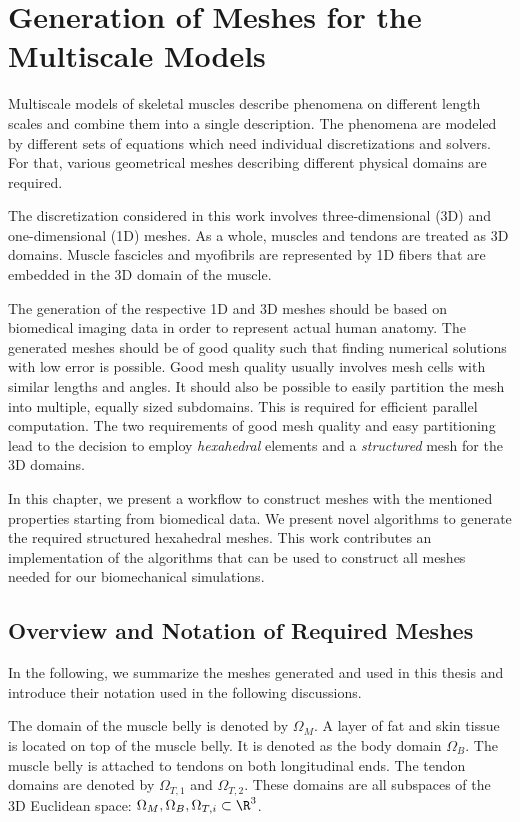
\chapter{Generation of Meshes for the Multiscale Models}\label{sec:generation_of_meshes_for_multiscale}
Multiscale models of skeletal muscles describe phenomena on different length scales and combine them into a single description. The phenomena are modeled by different sets of equations which need individual discretizations and solvers. For that, various geometrical meshes describing different physical domains are required.

The discretization considered in this work involves three-dimensional (3D) and one-dimensional (1D) meshes.
As a whole, muscles and tendons are treated as 3D domains. Muscle fascicles and myofibrils are represented by 1D fibers that are embedded in the 3D domain of the muscle.

The generation of the respective 1D and 3D meshes should be based on biomedical imaging data in order to represent actual human anatomy. The generated meshes should be of good quality such that finding numerical solutions with low error is possible. Good mesh quality usually involves mesh cells with similar lengths and angles. It should also be possible to easily partition the mesh into multiple, equally sized subdomains. This is required for efficient parallel computation.
The two requirements of good mesh quality and easy partitioning lead to the decision to employ \emph{hexahedral} elements and a \emph{structured} mesh for the 3D domains.

In this chapter, we present a workflow to construct meshes with the mentioned properties starting from biomedical data. We present novel algorithms to generate the required structured hexahedral meshes. This work contributes an implementation of the algorithms that can be used to construct all meshes needed for our biomechanical simulations.

\section{Overview and Notation of Required Meshes}\label{sec:overview_and_notation_of_required_meshes}
In the following, we summarize the meshes generated and used in this thesis and introduce their notation used in the following discussions.

The domain of the muscle belly is denoted by $\Omega_M$. A layer of fat and skin tissue is located on top of the muscle belly. It is denoted as the body domain $\Omega_B$.
The muscle belly is attached to tendons on both longitudinal ends. The tendon domains are denoted by $\Omega_{T,1}$ and $\Omega_{T,2}$. These domains are all subspaces of the 3D Euclidean space: $\Omega_M,\Omega_B,\Omega_{T,i} \subset \R^3$.

